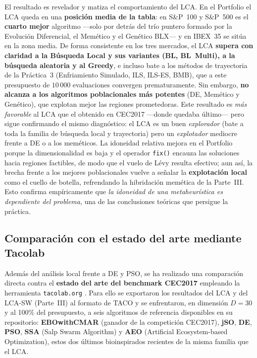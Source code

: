 El resultado es revelador y matiza el comportamiento del LCA. En el Portfolio el
LCA queda en una \textbf{posición media de la tabla}: en S\&P~100 y S\&P~500 es el
\textbf{cuarto mejor} algoritmo ---solo por detrás del trío puntero formado por la
Evolución Diferencial, el Memético y el Genético BLX--- y en IBEX~35 se sitúa en la
zona media. De forma consistente en los tres mercados, el LCA \textbf{supera con
claridad a la Búsqueda Local y sus variantes (BL, BL~Multi), a la búsqueda aleatoria
y al Greedy}, e incluso bate a los métodos de trayectoria de la Práctica~3
(Enfriamiento Simulado, ILS, ILS-ES, BMB), que a este presupuesto de $10\,000$
evaluaciones convergen prematuramente. Sin embargo, \textbf{no alcanza a los
algoritmos poblacionales más potentes} (DE, Memético y Genético), que explotan
mejor las regiones prometedoras. Este resultado es \emph{más favorable} al LCA que
el obtenido en CEC2017 ---donde quedaba último--- pero sigue confirmando el mismo
diagnóstico: el LCA es un buen \emph{explorador} (bate a toda la familia de búsqueda
local y trayectoria) pero un \emph{explotador} mediocre frente a DE o a los
meméticos. La idoneidad relativa mejora en el Portfolio porque la dimensionalidad es
baja y el operador \texttt{fix()} encauza las soluciones hacia regiones factibles,
de modo que el vuelo de Lévy resulta efectivo; aun así, la brecha frente a los
mejores poblacionales vuelve a señalar la \textbf{explotación local} como el cuello
de botella, refrendando la hibridación memética de la Parte~III. Esto confirma
empíricamente que \emph{la idoneidad de una metaheurística es dependiente del
problema}, una de las conclusiones teóricas que persigue la práctica.

\subsection{Comparación con el estado del arte mediante Tacolab}
\label{sec:tacolab}

Además del análisis local frente a DE y PSO, se ha realizado una comparación
directa contra el \textbf{estado del arte del benchmark CEC2017} empleando la
herramienta \texttt{tacolab.org} \cite{tacolab}. Para ello se exportaron los
resultados del LCA y del LCA-SW (Parte~III) al formato de TACO y se enfrentaron,
en dimensión $D=30$ y al 100\% del presupuesto, a seis algoritmos de referencia
disponibles en su repositorio: \textbf{EBOwithCMAR} (ganador de la competición
CEC2017), \textbf{jSO}, \textbf{DE}, \textbf{PSO}, \textbf{SSA} (Salp Swarm
Algorithm) y \textbf{AEO} (Artificial Ecosystem-based Optimization), estos dos
últimos bioinspirados recientes de la misma familia que el LCA.

